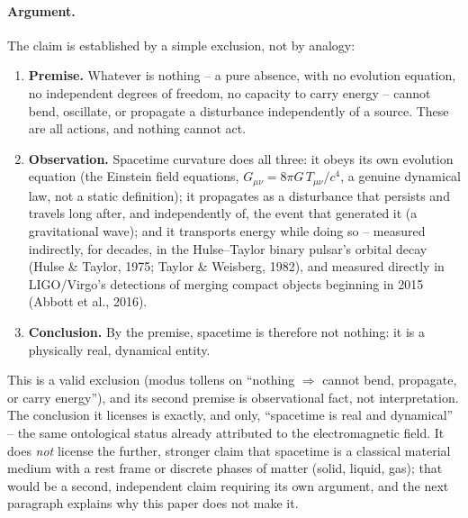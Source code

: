 \documentclass[12pt, a4paper]{article}
\begin{document}
\paragraph{Argument.} The claim is established by a simple
exclusion, not by analogy:
\begin{enumerate}
  \item \textbf{Premise.} Whatever is nothing -- a pure absence, with
    no evolution equation, no independent degrees of freedom, no
    capacity to carry energy -- cannot bend, oscillate, or propagate
    a disturbance independently of a source. These are all actions,
    and nothing cannot act.
  \item \textbf{Observation.} Spacetime curvature does all three: it
    obeys its own evolution equation (the Einstein field equations,
    $G_{\mu\nu}=8\pi G\,T_{\mu\nu}/c^4$, a genuine dynamical law, not
    a static definition); it propagates as a disturbance that
    persists and travels long after, and independently of, the
    event that generated it (a gravitational wave); and it
    transports energy while doing so -- measured indirectly, for
    decades, in the Hulse--Taylor binary pulsar's orbital decay
    (Hulse \& Taylor, 1975; Taylor \& Weisberg, 1982), and measured
    directly in LIGO/Virgo's detections of merging compact objects
    beginning in 2015 (Abbott et al., 2016).
  \item \textbf{Conclusion.} By the premise, spacetime is therefore
    not nothing: it is a physically real, dynamical entity.
\end{enumerate}
This is a valid exclusion (modus tollens on ``nothing $\Rightarrow$
cannot bend, propagate, or carry energy''), and its second premise is
observational fact, not interpretation. The conclusion it licenses is
exactly, and only, ``spacetime is real and dynamical'' -- the same
ontological status already attributed to the electromagnetic field.
It does \emph{not} license the further, stronger claim that spacetime
is a classical material medium with a rest frame or discrete phases
of matter (solid, liquid, gas); that would be a second, independent
claim requiring its own argument, and the next paragraph explains why
this paper does not make it.
\end{document}

